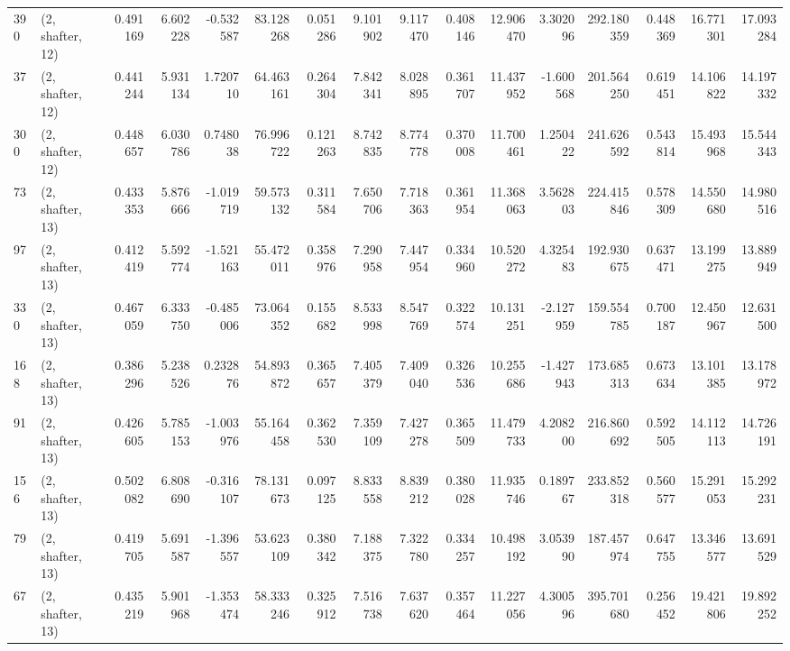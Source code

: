 \begin{tabular}{llrrrrrrrrrrrrrr}
390 &  (2, shafter, 12) &   0.491169 &   6.602228 &  -0.532587 &    83.128268 &   0.051286 &   9.101902 &   9.117470 &  0.408146 &  12.906470 &   3.302096 &   292.180359 &   0.448369 &  16.771301 &  17.093284 \\
37  &  (2, shafter, 12) &   0.441244 &   5.931134 &   1.720710 &    64.463161 &   0.264304 &   7.842341 &   8.028895 &  0.361707 &  11.437952 &  -1.600568 &   201.564250 &   0.619451 &  14.106822 &  14.197332 \\
300 &  (2, shafter, 12) &   0.448657 &   6.030786 &   0.748038 &    76.996722 &   0.121263 &   8.742835 &   8.774778 &  0.370008 &  11.700461 &   1.250422 &   241.626592 &   0.543814 &  15.493968 &  15.544343 \\
73  &  (2, shafter, 13) &   0.433353 &   5.876666 &  -1.019719 &    59.573132 &   0.311584 &   7.650706 &   7.718363 &  0.361954 &  11.368063 &   3.562803 &   224.415846 &   0.578309 &  14.550680 &  14.980516 \\
97  &  (2, shafter, 13) &   0.412419 &   5.592774 &  -1.521163 &    55.472011 &   0.358976 &   7.290958 &   7.447954 &  0.334960 &  10.520272 &   4.325483 &   192.930675 &   0.637471 &  13.199275 &  13.889949 \\
330 &  (2, shafter, 13) &   0.467059 &   6.333750 &  -0.485006 &    73.064352 &   0.155682 &   8.533998 &   8.547769 &  0.322574 &  10.131251 &  -2.127959 &   159.554785 &   0.700187 &  12.450967 &  12.631500 \\
168 &  (2, shafter, 13) &   0.386296 &   5.238526 &   0.232876 &    54.893872 &   0.365657 &   7.405379 &   7.409040 &  0.326536 &  10.255686 &  -1.427943 &   173.685313 &   0.673634 &  13.101385 &  13.178972 \\
91  &  (2, shafter, 13) &   0.426605 &   5.785153 &  -1.003976 &    55.164458 &   0.362530 &   7.359109 &   7.427278 &  0.365509 &  11.479733 &   4.208200 &   216.860692 &   0.592505 &  14.112113 &  14.726191 \\
156 &  (2, shafter, 13) &   0.502082 &   6.808690 &  -0.316107 &    78.131673 &   0.097125 &   8.833558 &   8.839212 &  0.380028 &  11.935746 &   0.189767 &   233.852318 &   0.560577 &  15.291053 &  15.292231 \\
79  &  (2, shafter, 13) &   0.419705 &   5.691587 &  -1.396557 &    53.623109 &   0.380342 &   7.188375 &   7.322780 &  0.334257 &  10.498192 &   3.053990 &   187.457974 &   0.647755 &  13.346577 &  13.691529 \\
67  &  (2, shafter, 13) &   0.435219 &   5.901968 &  -1.353474 &    58.333246 &   0.325912 &   7.516738 &   7.637620 &  0.357464 &  11.227056 &   4.300596 &   395.701680 &   0.256452 &  19.421806 &  19.892252 \\

\end{tabular}
